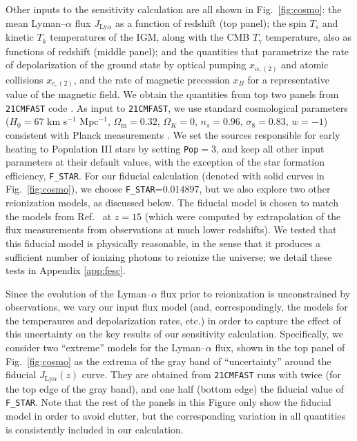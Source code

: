 Other inputs to the sensitivity calculation are all shown in Fig.~\ref{fig:cosmo}: the mean Lyman--$\alpha$ flux $J_{\text{Ly}\alpha}$ as a function of redshift (top panel); the spin $T_s$ and kinetic $T_k$ temperatures of the IGM, along with the CMB $T_\gamma$ temperature, also as functions of redshift (middle panel); and the quantities that parametrize the rate of depolarization of the ground state by optical pumping $x_{\alpha,(2)}$ and atomic collisions $x_{c,(2)}$, and the rate of magnetic precession $x_B$ for a representative value of the magnetic field. We obtain the quantities from top two panels from \texttt{21CMFAST} code \cite{2011MNRAS.411..955M}. As input to \texttt{21CMFAST}, we use standard cosmological parameters ($H_0=67$ km s$^{-1}$ Mpc$^{-1}$, $\Omega_\text{m}=0.32$, $\Omega_K=0$, $n_s=0.96$, $\sigma_8=0.83$, $w=-1$) consistent with Planck measurements \cite{2015arXiv150201589P}. We set the sources responsible for early heating to Population III stars by setting \verb|Pop|$=3$, and keep all other input parameters at their default values, with the exception of the star formation efficiency, \verb|F_STAR|. For our fiducial calculation (denoted with solid curves in Fig.~\ref{fig:cosmo}), we choose \verb|F_STAR|=$0.014897$, but we also explore two other reionization models, as discussed below. The fiducial model is chosen to match the models from Ref.~\cite{2012ApJ...746..125H} at $z=15$ (which were computed by extrapolation of the flux measurements from observations at much lower redshifts). We tested that this fiducial model is physically reasonable, in the sense that it produces a sufficient number of ionizing photons to reionize the universe; we detail these tests in Appendix \ref{app:fesc}. 

Since the evolution of the Lyman--$\alpha$ flux prior to reionization is unconstrained by observations, we vary our input flux model (and, correspondingly, the models for the temperaures and depolarization rates, etc.) in order to capture the effect of this uncertainty on the key results of our sensitivity calculation. Specifically, we consider two ``extreme'' models for the Lyman--$\alpha$ flux, shown in the top panel of Fig.~\ref{fig:cosmo} as the extrema of the gray band of ``uncertainty'' around the fiducial $J_{\text{Ly}\alpha}(z)$ curve. They are obtained from \texttt{21CMFAST} runs with twice (for the top edge of the gray band), and one half (bottom edge) the fiducial value of \verb|F_STAR|.  Note that the rest of the panels in this Figure only show the fiducial model in order to avoid clutter, but the corresponding variation in all quantities is consistently included in our calculation. 

